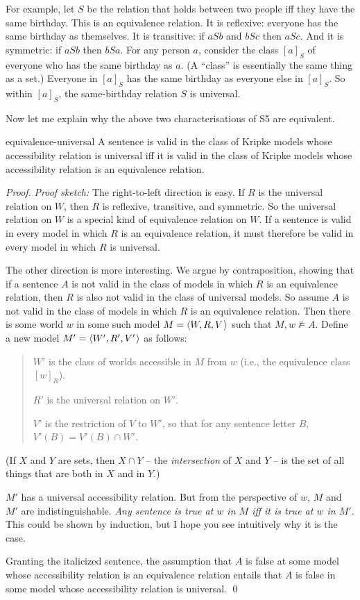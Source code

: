 For example, let $S$ be the relation that holds between two people iff they have
the same birthday. This is an equivalence relation. It is reflexive: everyone
has the same birthday as themselves. It is transitive: if $aSb$ and $bSc$ then
$aSc$. And it is symmetric: if $aSb$ then $bSa$. For any person $a$, consider
the class $[a]_S$ of everyone who has the same birthday as $a$. (A ``class'' is
essentially the same thing as a set.) Everyone in $[a]_S$ has the same birthday
as everyone else in $[a]_S$. So within $[a]_S$, the same-birthday relation $S$
is universal.

Now let me explain why the above two characterisations of S5 are equivalent.

\begin{observation}{equivalence-universal}
  A sentence is valid in the class of Kripke models whose accessibility relation
  is universal iff it is valid in the class of Kripke models whose accessibility
  relation is an equivalence relation.
\end{observation}
%
\begin{proof}
  \emph{Proof sketch:} The right-to-left direction is easy. If $R$ is the universal
  relation on $W$, then $R$ is reflexive, transitive, and symmetric. So the
  universal relation on $W$ is a special kind of equivalence relation on $W$. If
  a sentence is valid in every model in which $R$ is an equivalence relation, it
  must therefore be valid in every model in which $R$ is universal.

  The other direction is more interesting. We argue by contraposition, showing
  that if a sentence $A$ is not valid in the class of models in which $R$ is an
  equivalence relation, then $R$ is also not valid in the class of universal
  models. So assume $A$ is not valid in the class of models in which $R$ is an
  equivalence relation. Then there is some world $w$ in some such model
  $M = \t{W,R,V}$ such that $M,w \not\models A$. Define a new model
  $M' = \t{W',R',V'}$ as follows:
  \begin{quote}
    $W'$ is the class of worlds accessible in $M$ from $w$ (i.e., the
    equivalence class $[w]_R$).

    $R'$ is the universal relation on $W'$.

    $V'$ is the restriction of $V$ to $W'$, so that for any sentence letter $B$,
    $V'(B) = V'(B) \cap W'$.
  \end{quote}
  (If $X$ and $Y$ are sets, then $X \cap Y$ -- the \emph{intersection} of $X$ and
  $Y$ -- is the set of all things that are both in $X$ and in $Y$.)

  $M'$ has a universal accessibility relation. But from the perspective of $w$,
  $M$ and $M'$ are indistinguishable. \emph{Any sentence is true at $w$ in $M$ iff
    it is true at $w$ in $M'$.} This could be shown by induction, but I hope you
  see intuitively why it is the case.

  Granting the italicized sentence, the assumption that $A$ is false at some model
  whose accessibility relation is an equivalence relation entails that $A$ is
  false in some model whose accessibility relation is universal. \qed
\end{proof}

